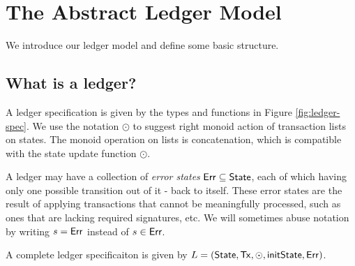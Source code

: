 \section{The Abstract Ledger Model}
\label{sec:model}

We introduce our ledger model and define some basic structure.


\subsection{What is a ledger?}
\label{sec:what}

A ledger specification is given by the types and functions in Figure \ref{fig:ledger-spec}.
We use the notation $\odot$ to suggest right monoid action of transaction lists on states.
The monoid operation on lists is concatenation, which is compatible with the state
update function $\odot$.

A ledger may have a collection of \emph{error states} $\mathsf{Err} \subseteq \mathsf{State}$,
each of which having only one possible transition out of it - back to itself.
These error states are the result of applying transactions that cannot be
meaningfully processed, such as ones that are lacking required signatures, etc.
We will sometimes abuse notation by writing $s = \mathsf{Err}$ instead of $s \in \mathsf{Err}$.

A complete ledger specificaiton is given by $L = (\mathsf{State}, \mathsf{Tx}, \odot, \mathsf{initState}, \mathsf{Err})$.

